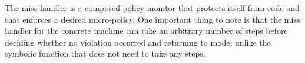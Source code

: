 The miss handler is a composed policy monitor that protects itself
from \USERname code and that enforces a desired micro-policy.  One
important thing to note is that the miss handler for the concrete
machine can take an arbitrary number of steps before deciding whether
no violation occurred and returning to \USERname mode, unlike the
symbolic \TRANSFER function that does not need to take any steps.

